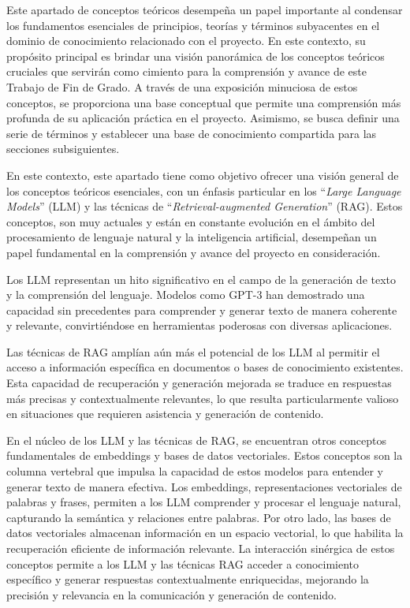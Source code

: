 
Este apartado de conceptos teóricos desempeña un papel importante al condensar los fundamentos esenciales de principios, teorías y términos subyacentes en el dominio de conocimiento relacionado con el proyecto. En este contexto, su propósito principal es brindar una visión panorámica de los conceptos teóricos cruciales que servirán como cimiento para la comprensión y avance de este Trabajo de Fin de Grado. A través de una exposición minuciosa de estos conceptos, se proporciona una base conceptual que permite una comprensión más profunda de su aplicación práctica en el proyecto. Asimismo, se busca definir una serie de términos y establecer una base de conocimiento compartida para las secciones subsiguientes.

En este contexto, este apartado tiene como objetivo ofrecer una visión general de los conceptos teóricos esenciales, con un énfasis particular en los ``\textit{Large Language Models}'' (LLM) y las técnicas de ``\textit{Retrieval-augmented Generation}'' (RAG). Estos conceptos, son muy actuales y están en constante evolución en el ámbito del procesamiento de lenguaje natural y la inteligencia artificial, desempeñan un papel fundamental en la comprensión y avance del proyecto en consideración.

Los LLM representan un hito significativo en el campo de la generación de texto y la comprensión del lenguaje. Modelos como GPT-3 han demostrado una capacidad sin precedentes para comprender y generar texto de manera coherente y relevante, convirtiéndose en herramientas poderosas con diversas aplicaciones.

Las técnicas de RAG amplían aún más el potencial de los LLM al permitir el acceso a información específica en documentos o bases de conocimiento existentes. Esta capacidad de recuperación y generación mejorada se traduce en respuestas más precisas y contextualmente relevantes, lo que resulta particularmente valioso en situaciones que requieren asistencia y generación de contenido.

En el núcleo de los LLM y las técnicas de RAG, se encuentran otros conceptos fundamentales de embeddings y bases de datos vectoriales. Estos conceptos son la columna vertebral que impulsa la capacidad de estos modelos para entender y generar texto de manera efectiva. Los embeddings, representaciones vectoriales de palabras y frases, permiten a los LLM comprender y procesar el lenguaje natural, capturando la semántica y relaciones entre palabras. Por otro lado, las bases de datos vectoriales almacenan información en un espacio vectorial, lo que habilita la recuperación eficiente de información relevante. La interacción sinérgica de estos conceptos permite a los LLM y las técnicas RAG acceder a conocimiento específico y generar respuestas contextualmente enriquecidas, mejorando la precisión y relevancia en la comunicación y generación de contenido.

